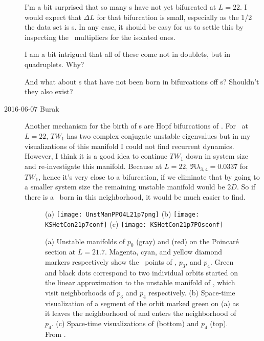 \begin{description}
I'm a bit surprised that so many \ppo s have not yet bifurcated at $L=22$.
I would expect that $\Delta L$ for that bifurcation is small, especially
as the 1/2 the data set is \ppo s. In any case, it should be easy for us
to settle this by inspecting the  \ppo\ multipliers for the isolated
ones.

I am a bit intrigued that all of these come not in doublets, but in
quadruplets. Why?

And what about \rpo s that have not been born in bifurcations off \ppo s?
Shouldn't they also exist?

\item[2016-06-07 Burak] Another mechanism for the birth of \rpo s are
Hopf bifurcations of \reqva . For \KS\ at $L=22$, $TW_1$ has two
complex conjugate unstable eigenvalues but in my visualizations of
this manifold I could not find recurrent dynamics. However, I think it
is a good idea to continue $TW_1$ down in system size and
re-investigate this manifold. Because at
$L=22$, $\Re \lambda_{3,4} = 0.0337$ for $TW_1$, hence it's very close
to a bifurcation, if we eliminate that by going to a smaller system size
the remaining unstable manifold would be $2D$. So if there is a
\rpo\ born in this neighborhood, it would be much easier to find.

\newcommand{\primeOrb}[1]{\ensuremath{p_#1}}
\begin{figure}[h]
   	\centering
   	(a) \texttt{[image: UnstManPPO4L21p7png]}
    (b) \texttt{[image: KSHetCon21p7conf]}
    (c) \texttt{[image: KSHetCon21p7POsconf]}
   		
   		\caption{\label{f-ConnectionsL21p7}
            (a) Unstable manifolds of $\primeOrb{0}$  (gray) and
            (red) on the Poincar\'e
   			section at $L=21.7$.
   			Magenta, cyan, and yellow diamond markers respectively show the
   			\PoincSec\ points of
            , %
            $\primeOrb{3}$,
            and
   			$\primeOrb{4}$.
   			Green and black dots correspond to two individual orbits
   			started on the linear approximation to the unstable manifold
   			of , %
            which visit neighborhoods of
   			$\primeOrb{3}$ and $\primeOrb{4}$ respectively.
   			(b) Space-time visualization of a segment of the orbit marked
   			green on (a) as it leaves the neighborhood of
   			and enters the neighborhood of $\primeOrb{4}$.
   			(c) Space-time visualizations of
            (bottom) and
   			$\primeOrb{4}$ (top).
   			From .
   		}
\end{figure}


\end{description}
